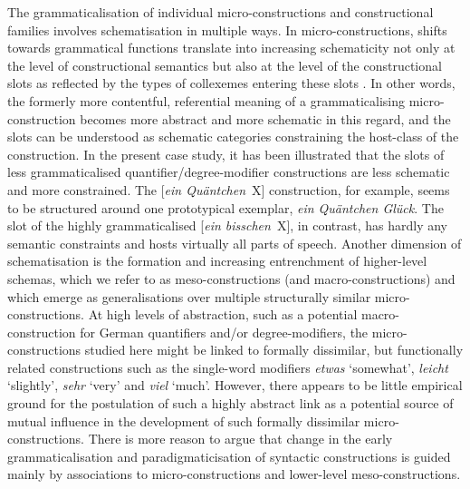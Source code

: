 \documentclass[output=paper]{langsci/langscibook}
\begin{document}
\begin{sloppypar}
The grammaticalisation of individual micro\hyp{}constructions and constructional families involves schematisation in multiple ways. In micro\hyp{}constructions, shifts towards grammatical functions translate into increasing schematicity not only at the level of constructional semantics but also at the level of the constructional slots as reflected by the types of collexemes entering these slots \citep[cf.][]{Perek2020}. In other words, the formerly more contentful, referential meaning of a grammaticalising micro-construction becomes more abstract and more schematic in this regard, and the slots can be understood as schematic categories constraining the host-class \citep{Himmelmann2004} of the construction. In the present case study, it has been illustrated that the slots of less grammaticalised quantifier\slash degree\hyp{}modifier constructions are less schematic and more constrained. The [\textit{ein Quäntchen}~X] construction, for example, seems to be structured around one prototypical exemplar, \textit{ein Quäntchen Glück}. The slot of the highly grammaticalised [\textit{ein bisschen}~X], in contrast, has hardly any semantic constraints and hosts virtually all parts of speech. Another dimension of schematisation is the formation and increasing entrenchment of higher-level schemas, which we refer to as meso\hyp{}constructions (and macro-constructions) and which emerge as generalisations over multiple structurally similar micro\hyp{}constructions. At high levels of abstraction, such as a potential macro-construction for German quantifiers and/or degree\hyp{}modifiers, the micro\hyp{}constructions studied here might be linked to formally dissimilar, but functionally related constructions such as the single-word modifiers \textit{etwas} ‘somewhat’, \textit{leicht} ‘slightly’, \textit{sehr} ‘very’ and \textit{viel} ‘much’. However, there appears to be little empirical ground for the postulation of such a highly abstract link as a potential source of mutual influence in the development of such formally dissimilar micro\hyp{}constructions. There is more reason to argue that change in the early grammaticalisation and paradigmaticisation of syntactic constructions is guided mainly by associations to micro\hyp{}constructions and lower-level meso\hyp{}constructions. 
\end{sloppypar}
\end{document}
